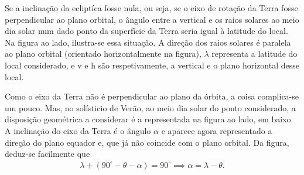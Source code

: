 \documentclass{article}
\begin{document}
\noindent
\begin{minipage}[t]{0.65\linewidth}
  \hspace{1em}
Se a inclinação da ecliptíca fosse nula, ou seja, se o eixo de rotação da Terra
fosse perpendicular ao plano orbital, o ângulo entre a vertical e os raios
solares ao meio dia solar num dado ponto da superfície da Terra seria igual à
latitude do local. Na figura ao lado, ilustra-se essa situação. A direção dos
raios solares é paralela ao plano orbital (orientado horizontalmente na figura),
$\lambda$ representa a latitude do local considerado, e {\sf v} e {\sf h} são
respetivamente, a vertical e o plano horizontal desse
local. 

\hspace{1em}
Como o eixo da Terra não é perpendicular ao plano da órbita, a coisa complica-se
um pouco. Mas, no solísticio de Verão, ao meio dia solar do ponto considerado, a
disposição geométrica a considerar é a representada na figura ao lado, em baixo.
A inclinação do eixo da Terra é o ângulo $\alpha$ e aparece agora representado a
direção do plano equador {\sf e}, que já não coincide com o plano orbital. Da
figura, deduz-se facilmente que
\begin{align*}
\lambda+(90^\circ-\theta-\alpha)=90^\circ \implies \alpha=\lambda-\theta.
\end{align*}
\end{minipage}\hfill
{}
\end{document}
